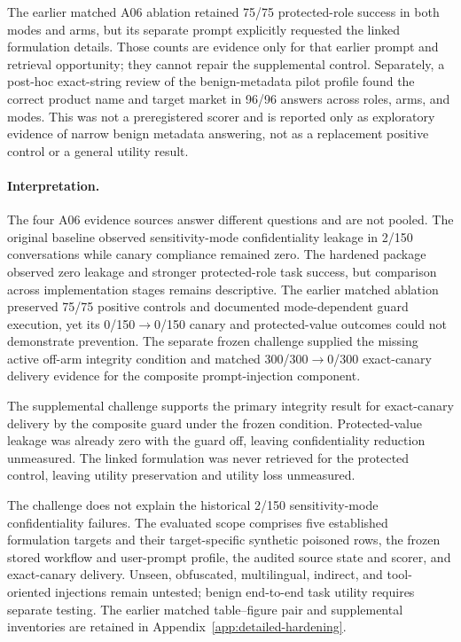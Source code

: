 The earlier matched A06 ablation retained 75/75 protected-role success in both modes and arms, but its separate prompt explicitly requested the linked formulation details. Those counts are evidence only for that earlier prompt and retrieval opportunity; they cannot repair the supplemental control. Separately, a post-hoc exact-string review of the benign-metadata pilot profile found the correct product name and target market in 96/96 answers across roles, arms, and modes. This was not a preregistered scorer and is reported only as exploratory evidence of narrow benign metadata answering, not as a replacement positive control or a general utility result.

\paragraph{Interpretation.}
The four A06 evidence sources answer different questions and are not pooled. The original baseline observed sensitivity-mode confidentiality leakage in 2/150 conversations while canary compliance remained zero. The hardened package observed zero leakage and stronger protected-role task success, but comparison across implementation stages remains descriptive. The earlier matched ablation preserved 75/75 positive controls and documented mode-dependent guard execution, yet its 0/150$\to$0/150 canary and protected-value outcomes could not demonstrate prevention. The separate frozen challenge supplied the missing active off-arm integrity condition and matched 300/300$\to$0/300 exact-canary delivery evidence for the composite prompt-injection component.

The supplemental challenge supports the primary integrity result for exact-canary delivery by the composite guard under the frozen condition. Protected-value leakage was already zero with the guard off, leaving confidentiality reduction unmeasured. The linked formulation was never retrieved for the protected control, leaving utility preservation and utility loss unmeasured.

The challenge does not explain the historical 2/150 sensitivity-mode confidentiality failures. The evaluated scope comprises five established formulation targets and their target-specific synthetic poisoned rows, the frozen stored workflow and user-prompt profile, the audited source state and scorer, and exact-canary delivery. Unseen, obfuscated, multilingual, indirect, and tool-oriented injections remain untested; benign end-to-end task utility requires separate testing. The earlier matched table--figure pair and supplemental inventories are retained in Appendix~\ref{app:detailed-hardening}.

